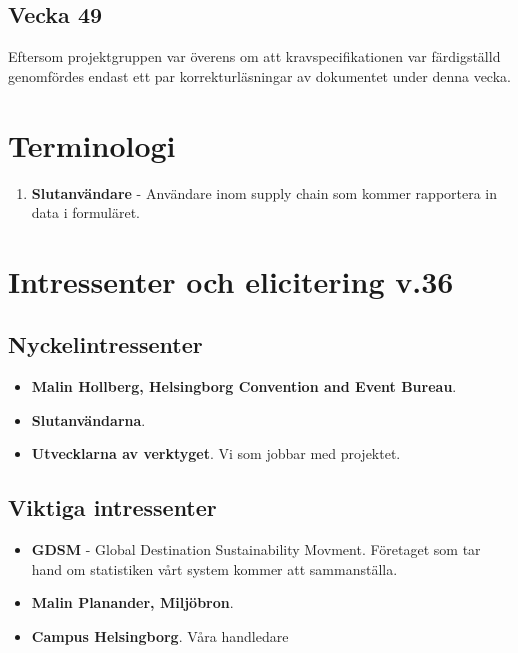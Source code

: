 \documentclass[12pt]{article}
\begin{document}
 \subsection{Vecka 49}
 Eftersom projektgruppen var överens om att kravspecifikationen var färdigställd genomfördes endast ett par korrekturläsningar av dokumentet under denna vecka.
 
 

  
    \newpage
    
\section{Terminologi}
    \begin{enumerate}
        \item \textbf{Slutanvändare} - Användare inom supply chain som kommer rapportera in data i formuläret.
        
    \end{enumerate}
    

\section{Intressenter och elicitering v.36}

    \subsection{Nyckelintressenter}
        \begin{itemize}
            \item \textbf{Malin Hollberg, Helsingborg Convention and Event Bureau}.
                \\
            \item \textbf{Slutanvändarna}.
                \\
             \item \textbf{Utvecklarna av verktyget}. Vi som jobbar med projektet.
                \\
        \end{itemize}
        
    \subsection{Viktiga intressenter}
        \begin{itemize}
            \item \textbf{GDSM} - Global Destination Sustainability Movment. Företaget som tar hand om statistiken vårt system kommer att sammanställa.
             \\
            \item \textbf{Malin Planander, Miljöbron}.
            \\
            \item \textbf{Campus Helsingborg}. Våra handledare
        \end{itemize}
        
\end{document}
